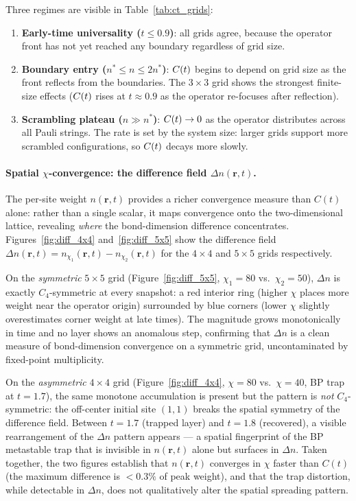 Three regimes are visible in Table~\ref{tab:ct_grids}:
\begin{enumerate}
  \item \textbf{Early-time universality ($t \leq 0.9$)}: all grids agree, because
        the operator front has not yet reached any boundary regardless of grid size.
  \item \textbf{Boundary entry ($n^* \leq n \leq 2n^*$)}: $C(t)$ begins to depend
        on grid size as the front reflects from the boundaries.
        The $3\times3$ grid shows the strongest finite-size effects ($C(t)$ rises
        at $t \approx 0.9$ as the operator re-focuses after reflection).
  \item \textbf{Scrambling plateau ($n \gg n^*$)}: $C(t) \to 0$ as the operator
        distributes across all Pauli strings.
        The rate is set by the system size: larger grids support more scrambled
        configurations, so $C(t)$ decays more slowly.
\end{enumerate}

\paragraph{Spatial $\chi$-convergence: the difference field $\Delta n(\mathbf{r},t)$.}
The per-site weight $n(\mathbf{r},t)$ provides a richer convergence measure than
$C(t)$ alone: rather than a single scalar, it maps convergence onto the
two-dimensional lattice, revealing \emph{where} the bond-dimension difference
concentrates.
Figures~\ref{fig:diff_4x4} and~\ref{fig:diff_5x5} show the difference field
$\Delta n(\mathbf{r},t) = n_{\chi_1}(\mathbf{r},t) - n_{\chi_2}(\mathbf{r},t)$
for the $4\times4$ and $5\times5$ grids respectively.

On the \emph{symmetric} $5\times5$ grid (Figure~\ref{fig:diff_5x5},
$\chi_1=80$ vs.\ $\chi_2=50$), $\Delta n$ is exactly $C_4$-symmetric at every
snapshot: a red interior ring (higher $\chi$ places more weight near the operator
origin) surrounded by blue corners (lower $\chi$ slightly overestimates corner
weight at late times).
The magnitude grows monotonically in time and no layer shows an anomalous step,
confirming that $\Delta n$ is a clean measure of bond-dimension convergence
on a symmetric grid, uncontaminated by fixed-point multiplicity.

On the \emph{asymmetric} $4\times4$ grid (Figure~\ref{fig:diff_4x4},
$\chi=80$ vs.\ $\chi=40$, BP trap at $t=1.7$), the same monotone accumulation
is present but the pattern is \emph{not} $C_4$-symmetric: the off-center initial
site $(1,1)$ breaks the spatial symmetry of the difference field.
Between $t=1.7$ (trapped layer) and $t=1.8$ (recovered), a visible rearrangement
of the $\Delta n$ pattern appears --- a spatial fingerprint of the BP metastable
trap that is invisible in $n(\mathbf{r},t)$ alone but surfaces in $\Delta n$.
Taken together, the two figures establish that $n(\mathbf{r},t)$ converges in
$\chi$ faster than $C(t)$ (the maximum difference is ${<}0.3\%$ of peak weight),
and that the trap distortion, while detectable in $\Delta n$, does not qualitatively
alter the spatial spreading pattern.

